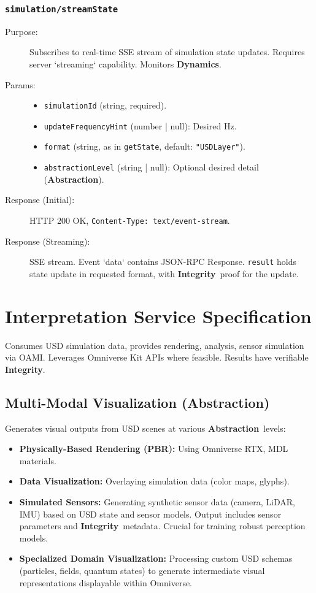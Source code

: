 \documentclass[12pt,a4paper]{report}
\newcommand{\Integrity}{\textbf{Integrity}}
\newcommand{\Abstraction}{\textbf{Abstraction}}
\newcommand{\Dynamics}{\textbf{Dynamics}}
\begin{document}
	\subsubsection{\texttt{simulation/streamState}}
	\label{app:oasim_sim_streamstate}
	\begin{description}
		\item[Purpose:] Subscribes to real-time SSE stream of simulation state updates. Requires server `streaming` capability. Monitors \Dynamics.
		\item[Params:]
		\begin{itemize} \itemsep0em
			\item \texttt{simulationId} (string, required).
			\item \texttt{updateFrequencyHint} (number | null): Desired Hz.
			\item \texttt{format} (string, as in \texttt{getState}, default: \texttt{"USDLayer"}).
			\item \texttt{abstractionLevel} (string | null): Optional desired detail (\Abstraction).
		\end{itemize}
		\item[Response (Initial):] HTTP 200 OK, \texttt{Content-Type: text/event-stream}.
		\item[Response (Streaming):] SSE stream. Event `data` contains JSON-RPC Response. \texttt{result} holds state update in requested format, with \Integrity\ proof for the update.
	\end{description}
	
	\section{Interpretation Service Specification}
	\label{app:oasim_interp_service_spec}
	
	Consumes USD simulation data, provides rendering, analysis, sensor simulation via OAMI. Leverages Omniverse Kit APIs where feasible. Results have verifiable \Integrity.
	
	\subsection{Multi-Modal Visualization (\Abstraction)}
	\label{app:oasim_viz}
	Generates visual outputs from USD scenes at various \Abstraction\ levels:
	\begin{itemize}
		\item \textbf{Physically-Based Rendering (PBR):} Using Omniverse RTX, MDL materials.
		\item \textbf{Data Visualization:} Overlaying simulation data (color maps, glyphs).
		\item \textbf{Simulated Sensors:} Generating synthetic sensor data (camera, LiDAR, IMU) based on USD state and sensor models. Output includes sensor parameters and \Integrity\ metadata. Crucial for training robust perception models.
		\item \textbf{Specialized Domain Visualization:} Processing custom USD schemas (particles, fields, quantum states) to generate intermediate visual representations displayable within Omniverse.
	\end{itemize}
	
\end{document}
